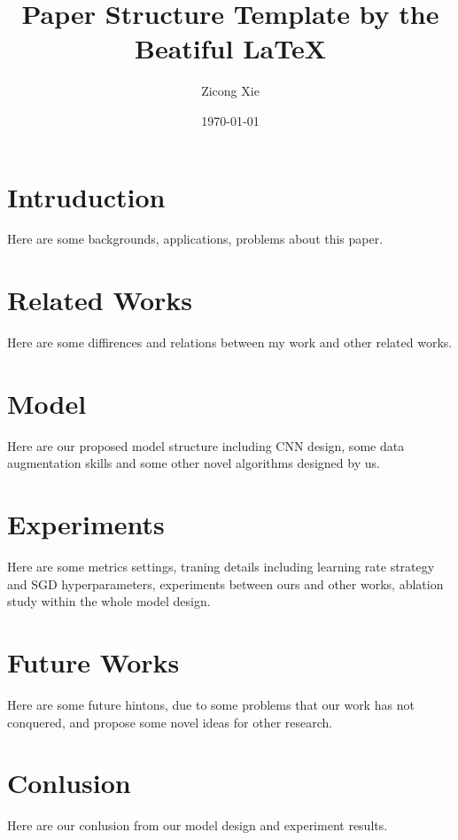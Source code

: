 \documentclass[a4Paper, 11pt, twocolumn]{article}
\title{Paper Structure Template by the Beatiful \LaTeX{}}
\author{Zicong Xie}
\date{\today}
\begin{document}
\maketitle

\section{Intruduction}%
\label{sec:intruduction}

Here are some backgrounds, applications, problems about this paper.

\section{Related Works}%
\label{sec:related_works}

Here are some diffirences and relations between my work and other related works.

\section{Model}%
\label{sec:model}

Here are our proposed model structure including CNN design, some data augmentation skills and  some other novel algorithms designed by us.

\section{Experiments}%
\label{sec:experiments}

Here are some metrics settings, traning details including learning rate strategy and SGD hyperparameters, experiments between ours and other works, ablation study within the whole model design.

\section{Future Works}%
\label{sec:future_works}

Here are some future hintons, due to some problems that our work has not conquered, and propose some novel ideas for other research.

\section{Conlusion}%
\label{sec:conlusion}

Here are our conlusion from our model design and experiment results.
\end{document}
